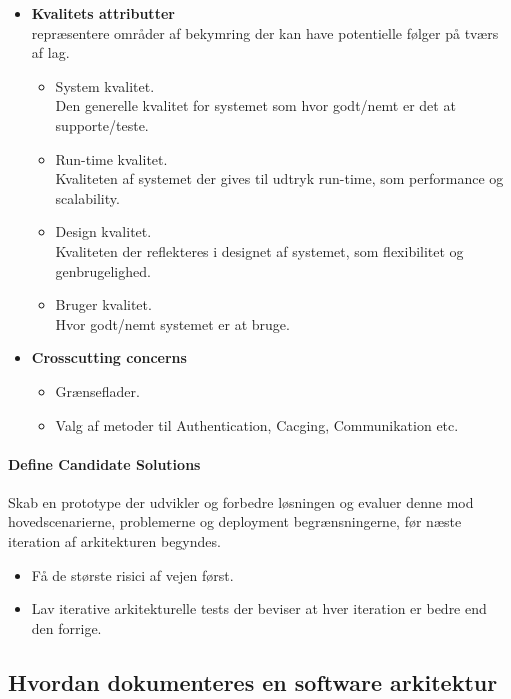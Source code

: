\begin{itemize}
	\item \textbf{Kvalitets attributter}\\
	repræsentere områder af bekymring der kan have potentielle følger på tværs af lag.
	\begin{itemize}
		\item System kvalitet.\\
		Den generelle kvalitet for systemet som hvor godt/nemt er det at supporte/teste.
		\item Run-time kvalitet.\\
		Kvaliteten af systemet der gives til udtryk run-time, som performance og scalability.
		\item Design kvalitet.\\
		Kvaliteten der reflekteres i designet af systemet, som flexibilitet og genbrugelighed.
		\item Bruger kvalitet.\\
		Hvor godt/nemt systemet er at bruge.
	\end{itemize}
	\item \textbf{Crosscutting concerns}
	\begin{itemize}
		\item Grænseflader.
		\item Valg af metoder til Authentication, Cacging, Communikation etc.
	\end{itemize}
\end{itemize}

\paragraph{Define Candidate Solutions}
Skab en prototype der udvikler og forbedre løsningen og evaluer denne mod hovedscenarierne, problemerne og deployment begrænsningerne, før næste iteration af arkitekturen begyndes.

\begin{itemize}
	\item Få de største risici af vejen først.
	\item Lav iterative arkitekturelle tests der beviser at hver iteration er bedre end den forrige.
\end{itemize}

\subsection{Hvordan dokumenteres en software arkitektur}
